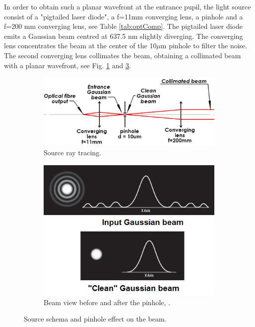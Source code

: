 In order to obtain such a planar wavefront at the entrance pupil, the light source consist of a "pigtailed laser diode", a f=11mm converging lens, a pinhole and a f=200 mm converging lens, see Table \ref{tab:optComp}. The pigtailed laser diode emits a Gaussian beam centred at 637.5 nm slightly diverging. The converging lens concentrates the beam at the center of the 10$\mu$m pinhole to filter the noise. The second converging lens collimates the beam, obtaining a collimated beam with a planar wavefront, see Fig. \ref{fig:sourceRayTracing} and \ref{fig:pinholeEffect}.

\begin{figure}
\centering
    \begin{subfigure}{0.5\textwidth}
        \includegraphics[width=\textwidth]{Figures/source.png}
        \caption{Source ray tracing.}
        \label{fig:sourceRayTracing}
    \end{subfigure}
    \quad
    \begin{subfigure}{0.3\textwidth}
        \includegraphics[width=\textwidth]{Figures/pinholeEffect.png}
        \caption{Beam view before and after the pinhole, \citep{SpatialFilters}.}
        \label{fig:pinholeEffect}
    \end{subfigure}
    \decoRule
    \caption{Source schema and pinhole effect on the beam.}
\end{figure}

